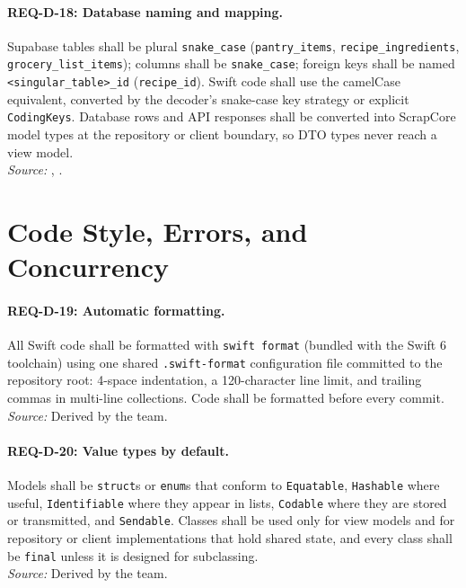 \paragraph{REQ-D-18: Database naming and mapping.}
 Supabase tables shall be plural \texttt{snake\_case} (\texttt{pantry\_items}, \texttt{recipe\_ingredients}, \texttt{grocery\_list\_items}); columns shall be \texttt{snake\_case}; foreign keys shall be named \texttt{<singular\_table>\_id} (\texttt{recipe\_id}). Swift code shall use the camelCase equivalent, converted by the decoder's snake-case key strategy or explicit \texttt{CodingKeys}. Database rows and API responses shall be converted into ScrapCore model types at the repository or client boundary, so DTO types never reach a view model.\\
\textit{Source:} , .

\section{Code Style, Errors, and Concurrency}

\paragraph{REQ-D-19: Automatic formatting.}
 All Swift code shall be formatted with \texttt{swift format} (bundled with the Swift 6 toolchain) using one shared \texttt{.swift-format} configuration file committed to the repository root: 4-space indentation, a 120-character line limit, and trailing commas in multi-line collections. Code shall be formatted before every commit.\\
\textit{Source:} Derived by the team.

\paragraph{REQ-D-20: Value types by default.}
 Models shall be \texttt{struct}s or \texttt{enum}s that conform to \texttt{Equatable}, \texttt{Hashable} where useful, \texttt{Identifiable} where they appear in lists, \texttt{Codable} where they are stored or transmitted, and \texttt{Sendable}. Classes shall be used only for view models and for repository or client implementations that hold shared state, and every class shall be \texttt{final} unless it is designed for subclassing.\\
\textit{Source:} Derived by the team.

